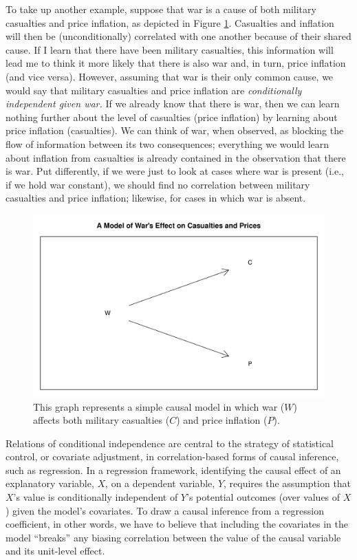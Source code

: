 \documentclass[
  12pt,
]{book}
\begin{document}
To take up another example, suppose that war is a cause of both military casualties and price inflation, as depicted in Figure \ref{fig:warDAG}. Casualties and inflation will then be (unconditionally) correlated with one another because of their shared cause. If I learn that there have been military casualties, this information will lead me to think it more likely that there is also war and, in turn, price inflation (and vice versa). However, assuming that war is their only common cause, we would say that military casualties and price inflation are \emph{conditionally independent given war.} If we already know that there is war, then we can learn nothing further about the level of casualties (price inflation) by learning about price inflation (casualties). We can think of war, when observed, as blocking the flow of information between its two consequences; everything we would learn about inflation from casualties is already contained in the observation that there is war. Put differently, if we were just to look at cases where war is present (i.e., if we hold war constant), we should find no correlation between military casualties and price inflation; likewise, for cases in which war is absent.

\begin{figure}

{\centering \includegraphics[width=.5\textwidth]{ii_files/figure-latex/warDAG-1} 

}

\caption{This graph represents a simple causal model in which war ($W$) affects both military casualties ($C$) and price inflation ($P$).}\label{fig:warDAG}
\end{figure}

Relations of conditional independence are central to the strategy of statistical control, or covariate adjustment, in correlation-based forms of causal inference, such as regression. In a regression framework, identifying the causal effect of an explanatory variable, \(X\), on a dependent variable, \(Y\), requires the assumption that \(X\)'s value is conditionally independent of \(Y\)'s potential outcomes (over values of \(X\)) given the model's covariates. To draw a causal inference from a regression coefficient, in other words, we have to believe that including the covariates in the model ``breaks'' any biasing correlation between the value of the causal variable and its unit-level effect.
\end{document}
